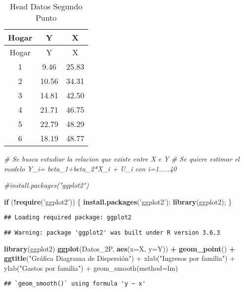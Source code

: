 \documentclass[
]{article}
\newenvironment{Shaded}{\begin{snugshade}}{\end{snugshade}}
\newcommand{\CommentTok}[1]{\textcolor[rgb]{0.56,0.35,0.01}{\textit{#1}}}
\newcommand{\ControlFlowTok}[1]{\textcolor[rgb]{0.13,0.29,0.53}{\textbf{#1}}}
\newcommand{\DataTypeTok}[1]{\textcolor[rgb]{0.13,0.29,0.53}{#1}}
\newcommand{\KeywordTok}[1]{\textcolor[rgb]{0.13,0.29,0.53}{\textbf{#1}}}
\newcommand{\NormalTok}[1]{#1}
\newcommand{\OperatorTok}[1]{\textcolor[rgb]{0.81,0.36,0.00}{\textbf{#1}}}
\newcommand{\StringTok}[1]{\textcolor[rgb]{0.31,0.60,0.02}{#1}}
\begin{document}
\begin{longtable}[]{@{}ccc@{}}
\caption{Head Datos Segundo Punto}\tabularnewline
\toprule
Hogar & Y & X\tabularnewline
\midrule
\endfirsthead
\toprule
Hogar & Y & X\tabularnewline
\midrule
\endhead
1 & 9.46 & 25.83\tabularnewline
2 & 10.56 & 34.31\tabularnewline
3 & 14.81 & 42.50\tabularnewline
4 & 21.71 & 46.75\tabularnewline
5 & 22.79 & 48.29\tabularnewline
6 & 18.19 & 48.77\tabularnewline
\bottomrule
\end{longtable}

\begin{Shaded}
\begin{Highlighting}[]
\CommentTok{# Se busca estudiar la relacion que existe entre X e Y}
\CommentTok{# Se quiere estimar el modelo Y_i= beta_1+beta_2*X_i + U_i  con i=1.....40}

\CommentTok{#install.packages("ggplot2")}

\ControlFlowTok{if}\NormalTok{ (}\OperatorTok{!}\KeywordTok{require}\NormalTok{(}\StringTok{'ggplot2'}\NormalTok{)) }
\NormalTok{\{}
  \KeywordTok{install.packages}\NormalTok{(}\StringTok{'ggplot2'}\NormalTok{);}
  \KeywordTok{library}\NormalTok{(ggplot2);}
\NormalTok{\}}
\end{Highlighting}
\end{Shaded}

\begin{verbatim}
## Loading required package: ggplot2
\end{verbatim}

\begin{verbatim}
## Warning: package 'ggplot2' was built under R version 3.6.3
\end{verbatim}

\begin{Shaded}
\begin{Highlighting}[]
\KeywordTok{library}\NormalTok{(ggplot2)}
\KeywordTok{ggplot}\NormalTok{(Datos_2P, }\KeywordTok{aes}\NormalTok{(}\DataTypeTok{x=}\NormalTok{X, }\DataTypeTok{y=}\NormalTok{Y)) }\OperatorTok{+}\StringTok{ }\KeywordTok{geom_point}\NormalTok{() }\OperatorTok{+}\StringTok{ }\KeywordTok{ggtitle}\NormalTok{(}\StringTok{"Gráfica Diagrama de Dispersión") + xlab("}\NormalTok{Ingresos por familia}\StringTok{") + ylab("}\NormalTok{Gastos por familia}\StringTok{") + geom_smooth(method=lm) }
\end{Highlighting}
\end{Shaded}

\begin{verbatim}
## `geom_smooth()` using formula 'y ~ x'
\end{verbatim}
\end{document}
